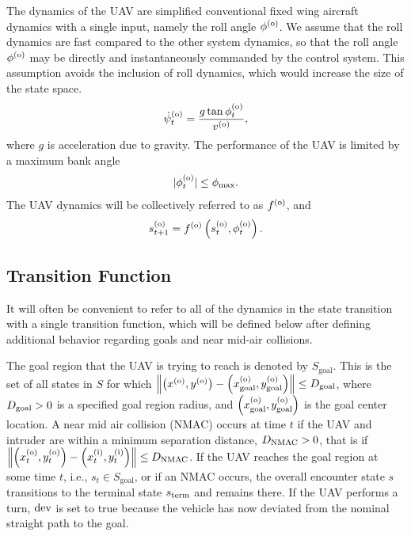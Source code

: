 The dynamics of the  UAV are simplified conventional fixed wing aircraft dynamics with a single input, namely the roll angle $\phi^{(\mathrm{o})}$. We assume that the roll dynamics are  fast compared to the other system dynamics, so that the roll angle $\phi^{(\mathrm{o})}$  may be directly and instantaneously commanded by the control system. This assumption avoids the inclusion of roll dynamics, which would increase the size of the state space.
\begin{equation}
    \dot{\psi}_t^{(\mathrm{o})} = \frac{g \tan \phi^{(\mathrm{o})}_t}{v^{(\mathrm{o})}} \text{,}
\end{equation}
where $g$ is acceleration due to gravity. The performance of the UAV is limited by a maximum bank angle
\begin{eqnarray}
    |\phi^{(\mathrm{o})}_t| \leq \phi_\text{max} \text{.}
\end{eqnarray}
The UAV dynamics will be collectively referred to as $f^{(\mathrm{o})}$, and
\begin{equation} \label{eq:odyn}
    s_{t+1}^{(\mathrm{o})} = f^{(\mathrm{o})}\left(s^{(\mathrm{o})}_t, \phi^{(\mathrm{o})}_t\right) \text{.}
\end{equation}

\subsection{Transition Function} \label{sec:control}

It will often be convenient to refer to all of the dynamics in the state transition with a single transition function, which will be defined below after defining additional behavior regarding goals and near mid-air collisions.

The goal region that the UAV is trying to reach is denoted by $S_\text{goal}$. This is the set of all states in $S$ for which $\left\|\left(x^{(\mathrm{o})}, y^{(\mathrm{o})}\right) - \left(x^{(\mathrm{o})}_{\text{goal}}, y^{(\mathrm{o})}_{\text{goal}}\right)\right\| \leq D_\mathrm{goal}$, where $D_\mathrm{goal}>0$ is a specified goal region radius, and $\left(x^{(\mathrm{o})}_{\text{goal}}, y^{(\mathrm{o})}_{\text{goal}}\right)$ is the goal center location.
A near mid air collision (NMAC) occurs at time $t$ if the UAV and intruder are within a minimum separation distance, $D_\mathrm{NMAC} > 0$, that is if $\left\|\left(x^{(\mathrm{o})}_t, y^{(\mathrm{o})}_t\right) - \left(x^{(\mathrm{i})}_t, y^{(\mathrm{i})}_t\right)\right\| \leq D_\mathrm{NMAC}$.
If the UAV reaches the goal region at some time $t$, i.e., $s_t \in S_\text{goal}$, or if an NMAC occurs, the overall encounter state $s$  transitions to the terminal state $s_{\mathrm{term}}$ and remains there.  If the UAV performs a turn, $\mathrm{dev }$ is set to true because the vehicle has now deviated from the nominal straight path to the goal.

